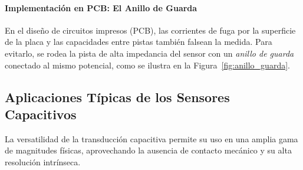 \paragraph{Implementación en PCB: El Anillo de Guarda}
En el diseño de circuitos impresos (PCB), las corrientes de fuga por la superficie de la placa y las capacidades entre pistas también falsean la medida. Para evitarlo, se rodea la pista de alta impedancia del sensor con un \emph{anillo de guarda} conectado al mismo potencial, como se ilustra en la Figura~\ref{fig:anillo_guarda}.

\begin{marginfigure}
    \centering
    \shorthandoff{>}
    \caption[Diseño de un anillo de guarda en PCB.]{Diseño de un anillo de guarda en PCB. El anillo actúa como una barrera de potencial que intercepta corrientes de fuga y neutraliza capacidades parásitas laterales.}\label{fig:anillo_guarda}
\end{marginfigure}

\subsection{Aplicaciones Típicas de los Sensores Capacitivos}\label{sec:aplicaciones_capacitivas}

La versatilidad de la transducción capacitiva permite su uso en una amplia gama de magnitudes físicas, aprovechando la ausencia de contacto mecánico y su alta resolución intrínseca.

